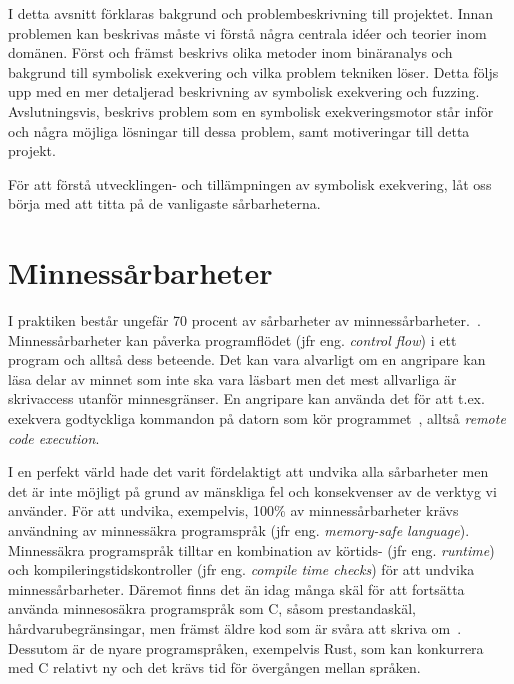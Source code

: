 I detta avsnitt förklaras bakgrund och problembeskrivning till projektet. Innan
problemen kan beskrivas måste vi förstå några centrala idéer och teorier inom
domänen. Först och främst beskrivs olika metoder inom binäranalys och bakgrund
till symbolisk exekvering och vilka problem tekniken löser. Detta följs upp med
en mer detaljerad beskrivning av symbolisk exekvering och fuzzing.
Avslutningsvis, beskrivs problem som en symbolisk exekveringsmotor står inför
och några möjliga lösningar till dessa problem, samt motiveringar till detta
projekt.

För att förstå utvecklingen- och tillämpningen av symbolisk exekvering, låt
oss börja med att titta på de vanligaste sårbarheterna.

\section{Minnessårbarheter}
I praktiken består ungefär 70 procent av sårbarheter av
minnessårbarheter.~\cite{miller19}. Minnessårbarheter kan påverka programflödet
(jfr eng. \emph{control flow}) i ett program och alltså dess beteende. Det kan
vara alvarligt om en angripare kan läsa delar av minnet som inte ska vara
läsbart men det mest allvarliga är skrivaccess utanför minnesgränser. En
angripare kan använda det för att t.ex. exekvera godtyckliga kommandon på
datorn som kör programmet~\cite{computer_security_cs161}, alltså \emph{remote
    code execution}.

I en perfekt värld hade det varit fördelaktigt att undvika alla sårbarheter men
det är inte möjligt på grund av mänskliga fel och konsekvenser av de verktyg vi
använder. För att undvika, exempelvis, 100\% av minnessårbarheter krävs
användning av minnessäkra programspråk (jfr eng. \emph{memory-safe language}).
Minnessäkra programspråk tilltar en kombination av körtids- (jfr eng.
\emph{runtime}) och kompileringstidskontroller (jfr eng. \emph{compile
    time checks}) för att undvika minnessårbarheter. Däremot finns det än idag
många skäl för att fortsätta använda minnesosäkra programspråk som C, såsom
prestandaskäl, hårdvarubegränsingar, men främst äldre kod som är svåra att
skriva om~\cite{computer_security_cs161}. Dessutom är de nyare programspråken,
exempelvis Rust, som kan konkurrera med C relativt ny och det krävs tid för
övergången mellan språken.

